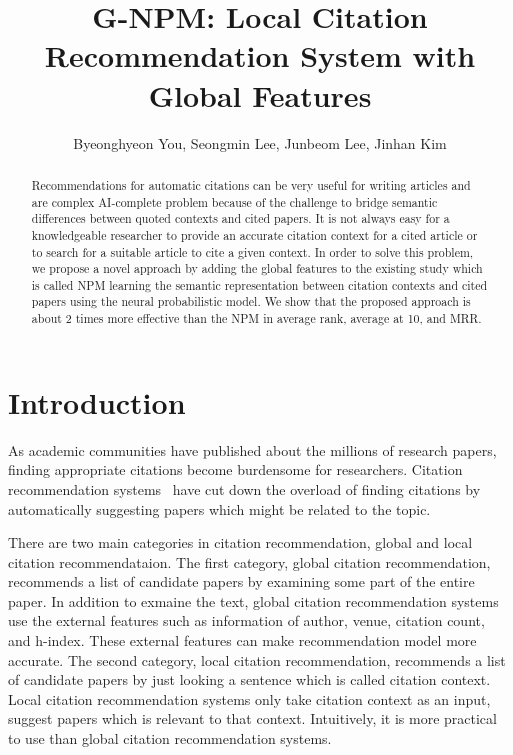 \documentclass{llncs}
\begin{document}
\title{G-NPM: Local Citation Recommendation System with Global Features}

\author{Byeonghyeon You, Seongmin Lee, Junbeom Lee, Jinhan Kim}


\maketitle

\begin{abstract}
Recommendations for automatic citations can be very useful for writing articles and are complex AI-complete problem because of the challenge to bridge semantic differences between quoted contexts and cited papers. It is not always easy for a knowledgeable researcher to provide an accurate citation context for a cited article or to search for a suitable article to cite a given context. In order to solve this problem, we propose a novel approach by adding the global features to the existing study which is called NPM learning the semantic representation between citation contexts and cited papers using the neural probabilistic model. We show that the proposed approach is about 2 times more effective than the NPM in average rank, average at 10, and MRR.

\end{abstract}

\section{Introduction}
\label{sec:introduction}
As academic communities have published about the millions of research papers, finding appropriate citations become burdensome for researchers. Citation recommendation systems~\cite{ren2014cluscite,Huang:2015:NPM:2886521.2886655,Bethard:2010:ICL:1871437.1871517} have cut down the overload of finding citations by automatically suggesting papers which might be related to the topic.


There are two main categories in citation recommendation, global and local citation recommendataion.
The first category, global citation recommendation, recommends a list of candidate papers by examining some part of the entire paper. In addition to exmaine the text, global citation recommendation systems use the external features such as information of author, venue, citation count, and h-index. These external features can make recommendation model more accurate.
The second category, local citation recommendation, recommends a list of candidate papers by just looking a sentence which is called citation context. Local citation recommendation systems only take citation context as an input, suggest papers which is relevant to that context. Intuitively, it is more practical to use than global citation recommendation systems.
\end{document}
